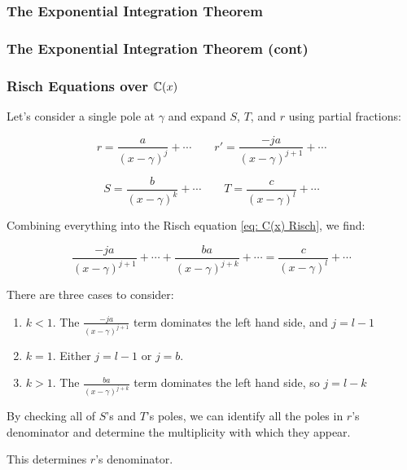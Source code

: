 \documentclass[aspectratio=169,dvipsnames]{beamer}
\begin{document}
\begin{frame}
\frametitle{The Exponential Integration Theorem}
\small
{}
\end{frame}

\begin{frame}
\frametitle{The Exponential Integration Theorem (cont)}
\tiny
{}
\end{frame}

\begin{frame}[fragile]
\small
\frametitle{Risch Equations over $\mathbb{C}(x)$}

Let's consider a single pole at
$\gamma$ and expand $S$, $T$, and $r$ using partial fractions:

$$r = \frac{a}{(x-\gamma)^j} + \cdots  \qquad  r' = \frac{-ja}{(x-\gamma)^{j+1}} + \cdots$$

$$S = \frac{b}{(x-\gamma)^k} + \cdots \qquad T = \frac{c}{(x-\gamma)^l} + \cdots$$

Combining everything into the Risch equation \eqref{eq: C(x) Risch}, we find:

$$\frac{-ja}{(x-\gamma)^{j+1}} + \cdots + \frac{ba}{(x-\gamma)^{j+k}} + \cdots = \frac{c}{(x-\gamma)^l} + \cdots$$

There are three cases to consider:

\begin{enumerate}

\item $k<1$.  The $\frac{-ja}{(x-\gamma)^{j+1}}$ term dominates the left hand side,
and $j = l-1$

\item $k=1$.  Either $j=l-1$ or $j=b$.

\item $k>1$.  The $\frac{ba}{(x-\gamma)^{j+k}}$ term dominates the left hand side, so $j=l-k$

\end{enumerate}

By checking all of $S$'s and $T$'s poles, we can
identify all the poles in $r$'s denominator and determine the
multiplicity with which they appear.

\bigskip

This determines $r$'s denominator.

\end{frame}
\end{document}
